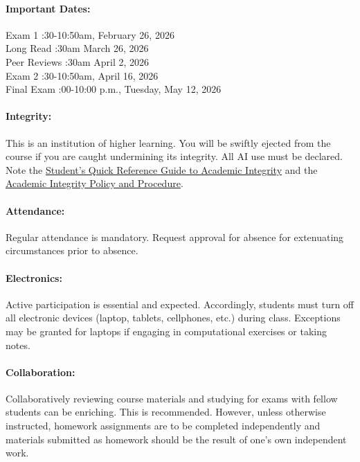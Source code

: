 \documentclass[11pt, a4paper]{article}
\begin{document}
\paragraph{Important Dates:}
\begin{center} \begin{minipage}{3.8in}
\begin{flushleft}
Exam 1      :30-10:50am, February 26, 2026\\
Long Read :30am March 26, 2026 \\
Peer Reviews :30am April 2, 2026 \\
Exam 2      :30-10:50am, April 16, 2026\\
Final Exam      :00-10:00 p.m., Tuesday, May 12, 2026\\
\end{flushleft}
\end{minipage}
\end{center}

\paragraph{Integrity:} This is an institution of higher learning. You will 
        be swiftly ejected from the course if you are caught undermining its 
                integrity. All AI use must be declared. Note the 
                \href{https://provost.illinois.edu/policies/policies/academic-integrity/students-quick-reference-guide-to-academic-integrity/}{Student's 
                Quick Reference Guide to Academic Integrity} and the 
                \href{https://studentcode.illinois.edu/article1/part4}{Academic Integrity Policy and Procedure}.
\paragraph{Attendance:} Regular attendance is mandatory. Request approval
        for absence for extenuating circumstances prior to absence.
\paragraph{Electronics:} Active participation is essential and expected.
        Accordingly, students must turn off all electronic devices (laptop,
        tablets, cellphones, etc.) during class. Exceptions may be granted for
        laptops if engaging in computational exercises or taking notes.
\paragraph{Collaboration:} Collaboratively reviewing course materials and
        studying for exams with fellow students can be enriching.  This is
                recommended.  However, unless otherwise instructed, homework
                assignments are to be completed independently and materials
                submitted as homework should be the result of one's own
                independent work.
\end{document}
